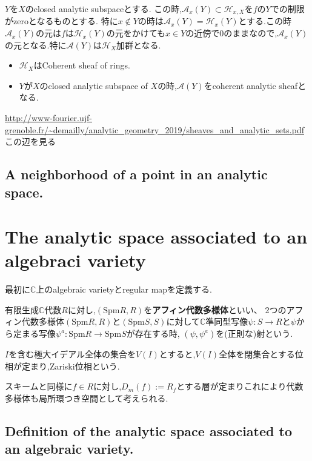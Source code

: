 $Y$を$X$のclosed analytic subspaceとする.
この時,$\mathcal{A}_x(Y) \subset \mathcal{H}_{x, X}$を$f$の$Y$での制限がzeroとなるものとする.
特に$x \notin Y$の時は$\mathcal{A}_x(Y) = \mathcal{H}_x(Y)$とする.この時$\mathcal{A}_x(Y)$の元は$f$は$\mathcal{H}_x(Y)$の元をかけても$x \in Y$の近傍で$0$のままなので,$\mathcal{A}_x(Y)$の元となる.特に$\mathcal{A}(Y)$は$\mathcal{H}_X$加群となる.

\begin{prop}
  \begin{itemize}
    \item $\mathcal{H}_X$はCoherent sheaf of rings.
    \item $Y$が$X$のclosed analytic subspace of $X$の時,$\mathcal{A}(Y)$をcoherent analytic sheafとなる.
  \end{itemize}
\end{prop}
\url{http://www-fourier.ujf-grenoble.fr/~demailly/analytic_geometry_2019/sheaves_and_analytic_sets.pdf}
この辺を見る

\subsection{A neighborhood of a point in an analytic space.}

\section{The analytic space associated to an algebraci variety}
最初に$\mathbb{C}$上のalgebraic varietyとregular mapを定義する.

\begin{screen}
\begin{dfn}
有限生成$\mathbb{C}$代数$R$に対し,$(\mathrm{Spm}R, R)$を\textbf{アフィン代数多様体}といい、
2つのアフィン代数多様体$(\mathrm{Spm}R, R)$と$(\mathrm{Spm}S, S)$に対して$\mathbb{C}$準同型写像$\psi: S \to R$と$\psi$から定まる写像$\psi^a: \mathrm{Spm}R \to \mathrm{Spm}S$が存在する時,
$(\psi, \psi^a)$を(正則な)射という.
\end{dfn}
\end{screen}
$I$を含む極大イデアル全体の集合を$V(I)$とすると,$V(I)$全体を閉集合とする位相が定まり,Zariski位相という.

\begin{rem}
  スキームと同様に$f \in R$に対し,$D_m(f):= R_f$とする層が定まりこれにより代数多様体も局所環つき空間として考えられる.
\end{rem}

\subsection{Definition of the analytic space associated to an algebraic variety.}

